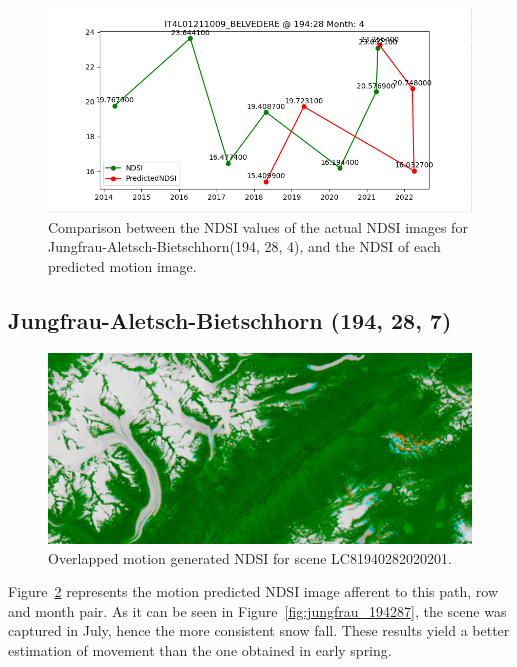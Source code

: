\documentclass[12pt, a4paper]{report}
\begin{document}
	\begin{figure}[h!]
		\centering
		\includegraphics[scale=0.5]{../images/experiment_194284.png}
		\caption{Comparison between the NDSI values of the actual NDSI images for Jungfrau-Aletsch-Bietschhorn(194, 28, 4), and the NDSI of each predicted motion image.}
		\label{fig:jungfrau_194284}
	\end{figure}

	
	\newpage{}
	
	\subsection{Jungfrau-Aletsch-Bietschhorn (194, 28, 7)}
	
	\begin{figure}[h!]
		\centering
		\includegraphics[width=\linewidth]{../images/experiment_1940287_image.png}
		\caption{Overlapped motion generated NDSI for scene LC81940282020201.}
		\label{fig:experiment_1940287_image}
	\end{figure}
	
	Figure~\ref{fig:experiment_1940287_image} represents the motion predicted NDSI image afferent to this path, row and month pair. As it can be seen in Figure~\ref{fig:jungfrau_194287}, the scene was captured in July, hence the more consistent snow fall. These results yield a better estimation of movement than the one obtained in early spring.
	
\end{document}
